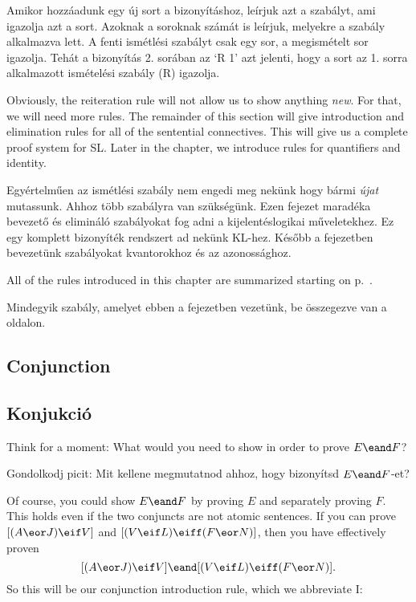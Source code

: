 Amikor hozzáadunk egy új sort a bizonyításhoz, leírjuk azt a szabályt, ami igazolja azt a sort. Azoknak a soroknak számát is leírjuk, melyekre a szabály alkalmazva lett. A fenti ismétlési szabályt csak egy sor, a megismételt sor igazolja. Tehát a bizonyítás 2. sorában az `R 1' azt jelenti, hogy a sort az 1. sorra alkalmazott ismételési szabály (R) igazolja.



Obviously, the reiteration rule will not allow us to show anything \emph{new}. For that, we will need more rules. The remainder of this section will give introduction and elimination rules for all of the sentential connectives. This will give us a complete proof system for SL. Later in the chapter, we introduce rules for quantifiers and identity.

Egyértelműen az ismétlési szabály nem engedi meg nekünk hogy bármi \emph{újat} mutassunk. Ahhoz több szabályra van szükségünk.
Ezen fejezet maradéka bevezető és elimináló szabályokat fog adni a kijelentéslogikai műveletekhez. Ez egy komplett bizonyíték rendszert ad nekünk KL-hez. Később a fejezetben bevezetünk szabályokat kvantorokhoz és az azonossághoz.

All of the rules introduced in this chapter are summarized starting on p.~\pageref{ProofRules}.

Mindegyik szabály, amelyet ebben a fejezetben vezetünk, be összegezve van a ~\pageref{ProofRules} oldalon.

\subsection*{Conjunction}
\subsection{Konjukció}

Think for a moment: What would you need to show in order to prove $E \eand F$?

Gondolkodj picit: Mit kellene megmutatnod ahhoz, hogy bizonyítsd $E \eand F$-et?

Of course, you could show $E \eand F$ by proving $E$ and separately proving $F$. 
This holds even if the two conjuncts are not atomic sentences. If you can prove $[(A \eor J) \eif V]$ and  $[(V \eif L) \eiff (F \eor N)]$, then you have effectively proven
$$[(A \eor J) \eif V] \eand [(V \eif L) \eiff (F \eor N)].$$
So this will be our conjunction introduction rule, which we abbreviate {\eand}I:

